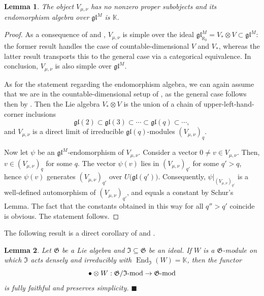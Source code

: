 \documentclass[11pt]{article}
\theoremstyle{plain}
\newtheorem{lemma}{Lemma}[section]
\theoremstyle{nonumberplain}
\theoremstyle{plain}
\theoremstyle{nonumberplain}
\newtheorem{proof}{Proof}
\newcommand\bK{\mathbb K}
\newcommand\fG{\mathfrak{G}}
\newcommand\fgl{\mathfrak{gl}}
\DeclareMathOperator{\End}{\mathrm{End}}
\newcommand{\qedhere}{\mbox{}\hfill\ensuremath{\blacksquare}}
\begin{document}
\begin{lemma}
  The object $V_{\mu,\nu}$ has no nonzero proper subobjects and its
  endomorphism algebra over $\fgl^M$ is $\bK$.  
\end{lemma}
\begin{proof}
  As a consequence of \cite[Theorem 2.2]{PS} and \cite[Theorem
  5.5]{PS2}, $V_{\mu,\nu}$ is simple over the ideal
  $\fgl^M_{\aleph_0}=V_*\otimes V\subset \fgl^M$: the former result handles the case of
  countable-dimensional $V$ and $V_*$, whereas the latter result transports
  this to the general case via a categorical equivalence. In
  conclusion, $V_{\mu,\nu}$ is also simple over $\fgl^M$.

  As for the statement regarding the endomorphism algebra, we can
  again assume that we are in the countable-dimensional setup of
  \cite{PS}, as the general case follows then by \cite[Theorem
  5.5]{PS2}.  Then the Lie algebra $V_*\otimes V$ is the union of a chain of
  upper-left-hand-corner inclusions
  \begin{equation*}
    \fgl(2)\subset \fgl(3)\subset \cdots\subset \fgl(q)\subset\cdots,
  \end{equation*}
  and $V_{\mu,\nu}$ is a direct limit of irreducible
  $\fgl(q)$-modules $\left(V_{\mu,\nu}\right)_q$.
  
  Now let $\psi$ be an $\fgl^M$-endomorphism of $V_{\mu,\nu}$.  Consider a vector $0\neq v\in V_{\mu,\nu}$.  Then, $v\in \left(V_{\mu,\nu}\right)_q$ for some $q$.  The vector $\psi(v)$ lies in $\left(V_{\mu,\nu}\right)_{q'}$ for some $q'>q$, hence $\psi(v)$ generates $\left(V_{\mu,\nu}\right)_{q'}$ over $U\big(\fgl(q')\big)$.  Consequently, $\psi|_{\left(V_{\mu,\nu}\right)_{q'}}$ is a well-defined automorphism of $\left(V_{\mu,\nu}\right)_{q'}$, and equals a constant by Schur's Lemma.  The fact that the constants obtained in this way for all $q''>q'$ coincide is obvious.  The statement follows.
\end{proof}









The following result is a direct corollary of \cite[Lemma 3]{Chi14} and \cite[Lemma 3.1]{us}.


\begin{lemma}\label{le.simple_aux}
Let $\fG$ be a Lie algebra and $\mathfrak{I} \subseteq \fG$ {be} an ideal. If $W$ is a $\fG$-module on which $\mathfrak{I} $ acts densely and irreducibly with $\End_\mathfrak{I} (W)=\bK$, then the functor 
\begin{equation*}
  \bullet\otimes W: {\fG/\mathfrak{I}\textup{-mod}}\to {\fG\textup{-mod}}
\end{equation*}
is fully faithful and preserves simplicity. 
  \qedhere
\end{lemma}
\end{document}
